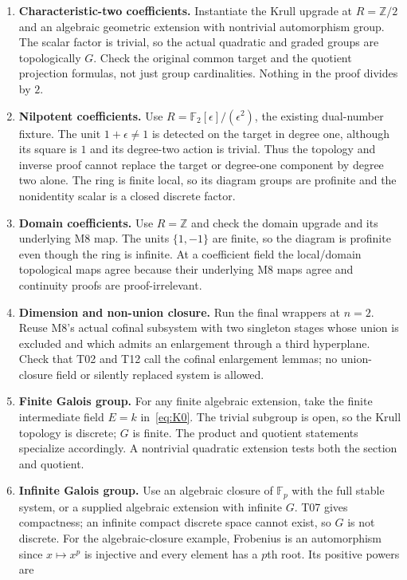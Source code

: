 \documentclass[11pt]{article}
\theoremstyle{remark}\newtheorem{remark}[theorem]{Remark}
\newcommand{\F}{\mathbb F}
\newcommand{\Z}{\mathbb Z}
\begin{document}
\begin{enumerate}[leftmargin=*]
\item \textbf{Characteristic-two coefficients.} Instantiate the Krull
upgrade at $R=\Z/2$ and an algebraic geometric extension with nontrivial
automorphism group. The scalar factor is trivial, so the actual
quadratic and graded groups are topologically $G$. Check the original
common target and the quotient projection formulas, not just group
cardinalities. Nothing in the proof divides by $2$.
\item \textbf{Nilpotent coefficients.} Use
$R=\F_2[\epsilon]/(\epsilon^2)$, the existing dual-number fixture.
The unit $1+\epsilon\ne1$ is detected on the target in degree one,
although its square is $1$ and its degree-two action is trivial.
Thus the topology and inverse proof cannot replace the target or
degree-one component by degree two alone. The ring is finite local,
so its diagram groups are profinite and the nonidentity scalar is a
closed discrete factor.
\item \textbf{Domain coefficients.} Use $R=\Z$ and check the domain
upgrade and its underlying M8 map. The units $\{1,-1\}$ are finite,
so the diagram is profinite even though the ring is infinite.
At a coefficient field the local/domain topological maps agree
because their underlying M8 maps agree and continuity proofs are
proof-irrelevant.
\item \textbf{Dimension and non-union closure.} Run the final wrappers
at $n=2$. Reuse M8's actual cofinal subsystem with two singleton stages
whose union is excluded and which admits an enlargement through a
third hyperplane. Check that T02 and T12 call the cofinal enlargement
lemmas; no union-closure field or silently replaced system is allowed.
\item \textbf{Finite Galois group.} For any finite algebraic extension,
take the finite intermediate field $E=k$ in~\eqref{eq:K0}. The trivial
subgroup is open, so the Krull topology is discrete; $G$ is finite.
The product and quotient statements specialize accordingly. A
nontrivial quadratic extension tests both the section and quotient.
\item \textbf{Infinite Galois group.} Use an algebraic closure of
$\F_p$ with the full stable system, or a supplied algebraic extension
with infinite $G$. T07 gives compactness; an infinite compact discrete
space cannot exist, so $G$ is not discrete. For the algebraic-closure
example, Frobenius is an automorphism since $x\mapsto x^p$ is
injective and every element has a $p$th root. Its positive powers are

\end{enumerate}
\end{document}
